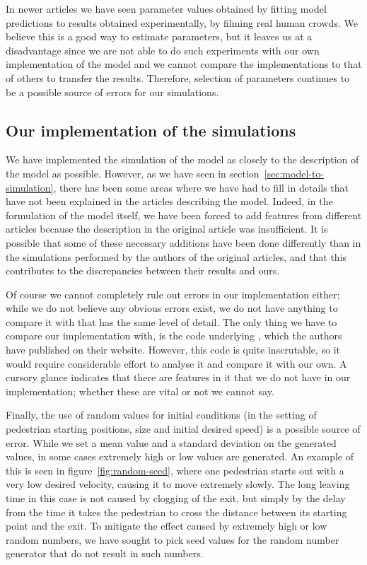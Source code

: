 In newer articles we have seen parameter values obtained by fitting model
predictions to results obtained experimentally, by filming real human crowds.
We believe this is a good way to estimate parameters, but it leaves us at a
disadvantage since we are not able to do such experiments with our own
implementation of the model and we cannot compare the implementations to that
of others to transfer the results. Therefore, selection of parameters
continues to be a possible source of errors for our simulations.

\subsection{Our implementation of the simulations}
\label{sec:random-errors}
We have implemented the simulation of the model as closely to the description
of the model as possible. However, as we have seen in
section~\ref{sec:model-to-simulation}, there has been some areas where we have
had to fill in details that have not been explained in the articles describing
the model. Indeed, in the formulation of the model itself, we have been forced
to add features from different articles because the description in the
original article was insufficient. It is possible that some of these necessary
additions have been done differently than in the simulations performed by the
authors of the original articles, and that this contributes to the
discrepancies between their results and ours.

Of course we cannot completely rule out errors in our implementation either;
while we do not believe any obvious errors exist, we do not have anything to
compare it with that has the same level of detail. The only thing we have to
compare our implementation with, is the code underlying \cite{helbing00},
which the authors have published on their website. However, this code is quite
inscrutable, so it would require considerable effort to analyse it and compare
it with our own. A cursory glance indicates that there are features in it that
we do not have in our implementation; whether these are vital or not we cannot
say.

Finally, the use of random values for initial conditions (in the setting of
pedestrian starting positions, size and initial desired speed) is a possible
source of error. While we set a mean value and a standard deviation on the
generated values, in some cases extremely high or low values are generated. An
example of this is seen in figure~\ref{fig:random-seed}, where one pedestrian
starts out with a very low desired velocity, causing it to move extremely
slowly. The long leaving time in this case is not caused by clogging of the
exit, but simply by the delay from the time it takes the pedestrian to cross
the distance between its starting point and the exit. To mitigate the effect
caused by extremely high or low random numbers, we have sought to pick seed
values for the random number generator that do not result in such numbers.

